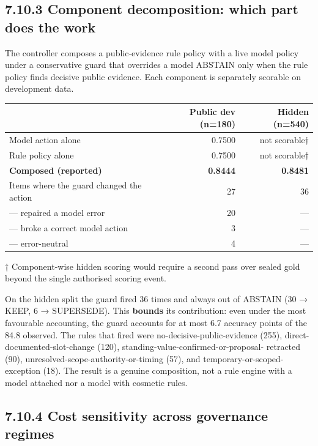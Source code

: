 \subsection{7.10.3 Component decomposition: which part does the
work}\label{component-decomposition-which-part-does-the-work}

The controller composes a public-evidence rule policy with a live model
policy under a conservative guard that overrides a model ABSTAIN only
when the rule policy finds decisive public evidence. Each component is
separately scorable on development data.

{\def\LTcaptype{none} %
\begin{longtable}[]{@{}lrr@{}}
\toprule\noalign{}
& Public dev (n=180) & Hidden (n=540) \\
\midrule\noalign{}
\endhead
\bottomrule\noalign{}
\endlastfoot
Model action alone & 0.7500 & not scorable† \\
Rule policy alone & 0.7500 & not scorable† \\
\textbf{Composed (reported)} & \textbf{0.8444} & \textbf{0.8481} \\
Items where the guard changed the action & 27 & 36 \\
--- repaired a model error & 20 & --- \\
--- broke a correct model action & 3 & --- \\
--- error-neutral & 4 & --- \\
\end{longtable}
}

† Component-wise hidden scoring would require a second pass over sealed
gold beyond the single authorised scoring event.

On the hidden split the guard fired 36 times and always out of ABSTAIN
(30 → KEEP, 6 → SUPERSEDE). This \textbf{bounds} its contribution: even
under the most favourable accounting, the guard accounts for at most 6.7
accuracy points of the 84.8 observed. The rules that fired were
no-decisive-public-evidence (255), direct-documented-slot-change (120),
standing-value-confirmed-or-proposal- retracted (90),
unresolved-scope-authority-or-timing (57), and
temporary-or-scoped-exception (18). The result is a genuine composition,
not a rule engine with a model attached nor a model with cosmetic rules.

\subsection{7.10.4 Cost sensitivity across governance
regimes}\label{cost-sensitivity-across-governance-regimes}

